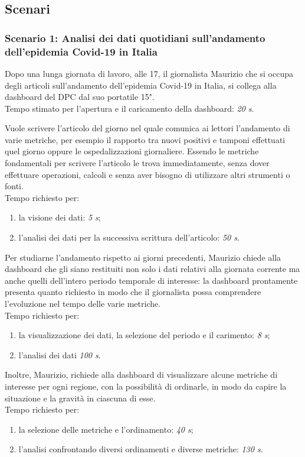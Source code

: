 \subsection{Scenari}
\subsubsection*{Scenario 1: Analisi dei dati quotidiani sull'andamento dell'epidemia Covid-19 in Italia}
Dopo una lunga giornata di lavoro, alle 17, il giornalista Maurizio che si occupa degli articoli sull'andamento dell'epidemia Covid-19 in Italia, si collega alla dashboard del DPC dal suo portatile 15".\\
Tempo stimato per l'apertura e il caricamento della dashboard: \textit{20 s}.

Vuole scrivere l'articolo del giorno nel quale comunica ai lettori l'andamento di varie metriche, per esempio il rapporto tra nuovi positivi e tamponi effettuati quel giorno oppure le ospedalizzazioni giornaliere. Essendo le metriche fondamentali per scrivere l'articolo le trova immediatamente, senza dover effettuare operazioni, calcoli e senza aver bisogno di utilizzare altri strumenti o fonti.\\
Tempo richiesto per:
\begin{enumerate}
    \item la visione dei dati: \textit{5 s};
    \item l'analisi dei dati per la successiva scrittura dell'articolo: \textit{50 s}.
\end{enumerate}

Per studiarne l'andamento rispetto ai giorni precedenti, Maurizio chiede alla dashboard che gli siano restituiti non solo i dati relativi alla giornata corrente ma anche quelli dell'intero periodo temporale di interesse: la dashboard prontamente presenta quanto richiesto in modo che il giornalista possa comprendere l'evoluzione nel tempo delle varie metriche.\\
Tempo richiesto per:
\begin{enumerate}
    \item la visualizzazione dei dati, la selezione del periodo e il carimento: \textit{8 s};
    \item l'analisi dei dati \textit{100 s}.
\end{enumerate}

Inoltre, Maurizio, richiede alla dashboard di visualizzare alcune metriche di interesse per ogni regione, con la possibilità di ordinarle, in modo da capire la situazione e la gravità in ciascuna di esse.\\
Tempo richiesto per:
\begin{enumerate}
    \item la selezione delle metriche e l'ordinamento: \textit{40 s};
    \item l'analisi confrontando diversi ordinamenti e diverse metriche: \textit{130 s}.
\end{enumerate}

